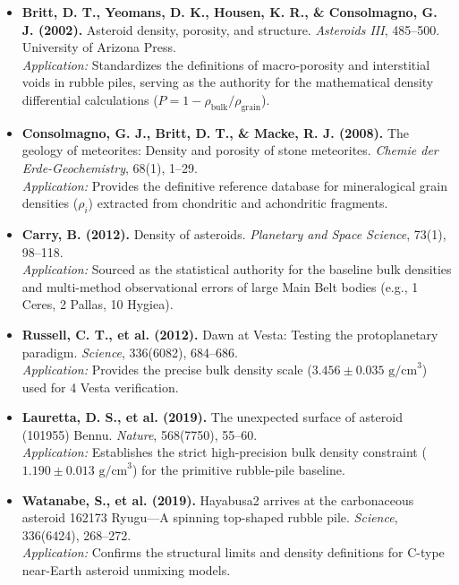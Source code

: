 \documentclass[11pt,letterpaper]{article}
\begin{document}
\begin{itemize}
    \item \textbf{Britt, D. T., Yeomans, D. K., Housen, K. R., \& Consolmagno, G. J. (2002).} Asteroid density, porosity, and structure. \textit{Asteroids III}, 485--500. University of Arizona Press. \\
    \textit{Application:} Standardizes the definitions of macro-porosity and interstitial voids in rubble piles, serving as the authority for the mathematical density differential calculations ($P = 1 - \rho_{\text{bulk}}/\rho_{\text{grain}}$).
    
    \item \textbf{Consolmagno, G. J., Britt, D. T., \& Macke, R. J. (2008).} The geology of meteorites: Density and porosity of stone meteorites. \textit{Chemie der Erde-Geochemistry}, 68(1), 1--29. \\
    \textit{Application:} Provides the definitive reference database for mineralogical grain densities ($\rho_i$) extracted from chondritic and achondritic fragments.
    
    \item \textbf{Carry, B. (2012).} Density of asteroids. \textit{Planetary and Space Science}, 73(1), 98--118. \\
    \textit{Application:} Sourced as the statistical authority for the baseline bulk densities and multi-method observational errors of large Main Belt bodies (e.g., 1 Ceres, 2 Pallas, 10 Hygiea).
    
    \item \textbf{Russell, C. T., et al. (2012).} Dawn at Vesta: Testing the protoplanetary paradigm. \textit{Science}, 336(6082), 684--686. \\
    \textit{Application:} Provides the precise bulk density scale ($3.456 \pm 0.035\text{ g/cm}^3$) used for 4 Vesta verification.
    
    \item \textbf{Lauretta, D. S., et al. (2019).} The unexpected surface of asteroid (101955) Bennu. \textit{Nature}, 568(7750), 55--60. \\
    \textit{Application:} Establishes the strict high-precision bulk density constraint ($1.190 \pm 0.013\text{ g/cm}^3$) for the primitive rubble-pile baseline.
    
    \item \textbf{Watanabe, S., et al. (2019).} Hayabusa2 arrives at the carbonaceous asteroid 162173 Ryugu---A spinning top-shaped rubble pile. \textit{Science}, 336(6424), 268--272. \\
    \textit{Application:} Confirms the structural limits and density definitions for C-type near-Earth asteroid unmixing models.
\end{itemize}
\end{document}
